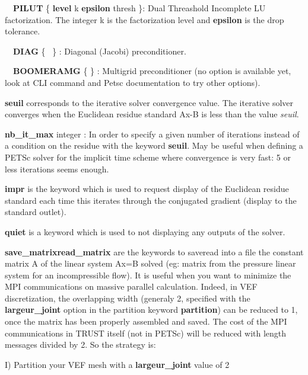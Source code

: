 \ \ \textbf{PILUT} \{ \textbf{level} k \textbf{epsilon} thresh \}: Dual Threashold Incomplete LU factorization. The
integer k is the factorization level and \textbf{epsilon} is the drop tolerance.

\ \ \textbf{DIAG} \{ \ \} : Diagonal (Jacobi) preconditioner.

\ \ \textbf{BOOMERAMG} \{ \} : Multigrid preconditioner (no option is available yet, look at CLI command and
Petsc documentation to try other options).


\bigskip

\textbf{seuil}\textit{ }corresponds to the iterative solver convergence value. The iterative solver converges when the
Euclidean residue standard {\textbar}{\textbar}Ax-B{\textbar}{\textbar} is less than the value \textit{seuil}. 


\bigskip

\textbf{nb\_it\_max} integer : In order to specify a given number of iterations instead of a condition on the residue
with the keyword \textbf{seuil}. May be useful when defining a PETSc solver for the implicit time scheme where
convergence is very fast: 5 or less iterations seems enough.


\bigskip

\textbf{impr} is the keyword which is used to request display of the Euclidean residue standard each time this iterates
through the conjugated gradient (display to the standard outlet).


\bigskip

\textbf{quiet} is a keyword which is used to not displaying any outputs of the solver.


\bigskip

\textbf{save\_matrix{\textbar}read\_matrix} are the keywords to save{\textbar}read into a file the constant matrix A of
the linear system Ax=B solved (eg: matrix from the pressure linear system for an incompressible flow). It is useful
when you want to minimize the MPI communications on massive parallel calculation. Indeed, in VEF discretization, the
overlapping width (generaly 2, specified with the \textbf{largeur\_joint} option in the partition keyword
\textbf{partition}) can be reduced to 1, once the matrix has been properly assembled and saved. The cost of the MPI
communications in TRUST itself (not in PETSc) will be reduced with length messages divided by 2. So the strategy is:

I) Partition your VEF mesh with a \textbf{largeur\_joint }value of 2

